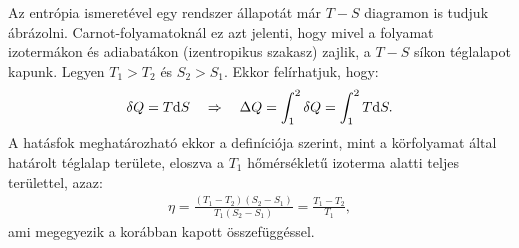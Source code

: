 Az entrópia ismeretével egy rendszer állapotát már $T-S$ diagramon is tudjuk ábrázolni. Carnot-folyamatoknál ez azt jelenti, hogy mivel a folyamat izotermákon és adiabatákon (izentropikus szakasz) zajlik, a $T-S$ síkon téglalapot kapunk. Legyen $T_1>T_2$ és $S_2>S_1$. Ekkor felírhatjuk, hogy:
\begin{align}
\delta Q = T\mathrm{d}S \quad\Rightarrow\quad \Delta Q = \int_1^2 \delta Q = \int_1^2 T \mathrm{d}S.
\end{align}
A hatásfok meghatározható ekkor a definíciója szerint, mint a körfolyamat által határolt téglalap területe, eloszva a $T_1$ hőmérsékletű izoterma alatti teljes területtel, azaz:
\begin{align}
\eta = \frac{(T_1-T_2)(S_2-S_1)}{T_1(S_2-S_1)} = \frac{T_1-T_2}{T_1},
\end{align}
ami megegyezik a korábban kapott összefüggéssel.